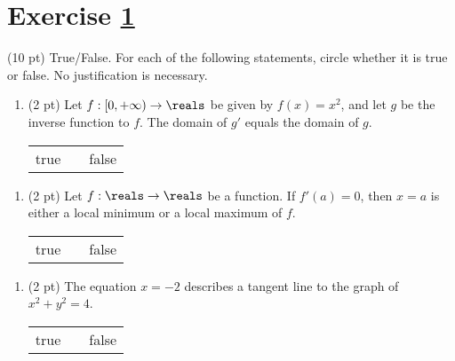 %
%





%
%
%
%


\section{Exercise \ref{sec : Math112 Spring2022 FinalExam P1Q1}}
\label{sec : Math112 Spring2022 FinalExam P1Q1}

(10 pt) True/False. For each of the following statements, circle whether it is true or false. No justification is necessary.

\begin{enumerate}[label=(\alph*)]
\item\label{itm : Exam4P1Q1a} (2 pt) Let $f : [0,+\infty) \rightarrow \reals$ be given by $f(x) = x^{2}$, and let $g$ be the inverse function to $f$. The domain of $g'$ equals the domain of $g$.
\begin{center}
\begin{tabular}{c c c}
true	&	\hspace{1in}	&	false
\end{tabular}
\end{center}
\end{enumerate}

\spaceSolution{0.5in}{%
}%



\begin{enumerate}[resume,label=(\alph*)]
\item\label{itm : Exam4P1Q1b} (2 pt) Let $f : \reals \rightarrow \reals$ be a function. If $f'(a) = 0$, then $x = a$ is either a local minimum or a local maximum of $f$.
\begin{center}
\begin{tabular}{c c c}
true	&	\hspace{1in}	&	false
\end{tabular}
\end{center}
\end{enumerate}

\spaceSolution{0.5in}{%
}%



\begin{enumerate}[resume,label=(\alph*)]
\item\label{itm : Exam4P1Q1c} (2 pt) The equation $x = -2$ describes a tangent line to the graph of $x^{2} + y^{2} = 4$.
\begin{center}
\begin{tabular}{c c c}
true	&	\hspace{1in}	&	false
\end{tabular}
\end{center}
\end{enumerate}

